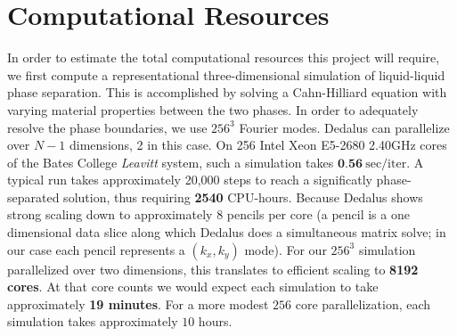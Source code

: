 \documentclass{article}
\begin{document}
\section{Computational Resources}
\label{sec:comp}

In order to estimate the total computational resources this project will require, we first compute a representational three-dimensional simulation of liquid-liquid phase separation.
This is accomplished by solving a Cahn-Hilliard equation with varying material properties between the two phases.
In order to adequately resolve the phase boundaries, we use $256^3$ Fourier modes.
Dedalus can parallelize over $N-1$ dimensions, 2 in this case.
On 256 Intel Xeon E5-2680 2.40GHz cores of the Bates College \emph{Leavitt} system, such a simulation takes $\mathbf{0.
56}\ \mathrm{sec/iter}$.
A typical run takes approximately 20,000 steps to reach a significatly phase-separated solution, thus requiring \textbf{2540} CPU-hours.
Because Dedalus shows strong scaling down to approximately 8 pencils per core (a pencil is a one dimensional data slice along which Dedalus does a simultaneous matrix solve; in our case each pencil represents a $(k_x, k_y)$ mode).
For our $256^3$ simulation parallelized over two dimensions, this translates to efficient scaling to \textbf{8192 cores}.
At that core counts we would expect each simulation to take approximately \textbf{19 minutes}.
For a more modest $256$ core parallelization, each simulation takes approximately $10$ hours.
\end{document}
